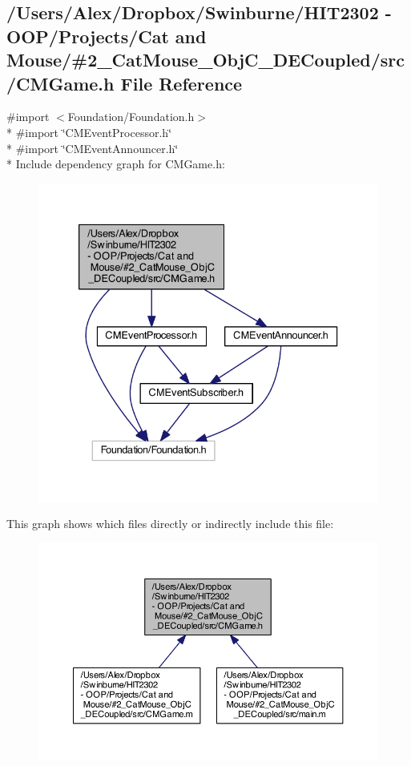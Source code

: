 \subsection{/\-Users/\-Alex/\-Dropbox/\-Swinburne/\-H\-I\-T2302 -\/ O\-O\-P/\-Projects/\-Cat and Mouse/\#2\-\_\-\-Cat\-Mouse\-\_\-\-Obj\-C\-\_\-\-D\-E\-Coupled/src/\-C\-M\-Game.h File Reference}
\label{_c_m_game_8h}
{\ttfamily \#import $<$Foundation/\-Foundation.\-h$>$}\\*
{\ttfamily \#import \char`\"{}C\-M\-Event\-Processor.\-h\char`\"{}}\\*
{\ttfamily \#import \char`\"{}C\-M\-Event\-Announcer.\-h\char`\"{}}\\*
Include dependency graph for C\-M\-Game.\-h\-:
\nopagebreak
\begin{figure}[H]
\begin{center}
\leavevmode
\includegraphics[width=333pt]{_c_m_game_8h__incl}
\end{center}
\end{figure}
This graph shows which files directly or indirectly include this file\-:
\nopagebreak
\begin{figure}[H]
\begin{center}
\leavevmode
\includegraphics[width=350pt]{_c_m_game_8h__dep__incl}
\end{center}
\end{figure}
